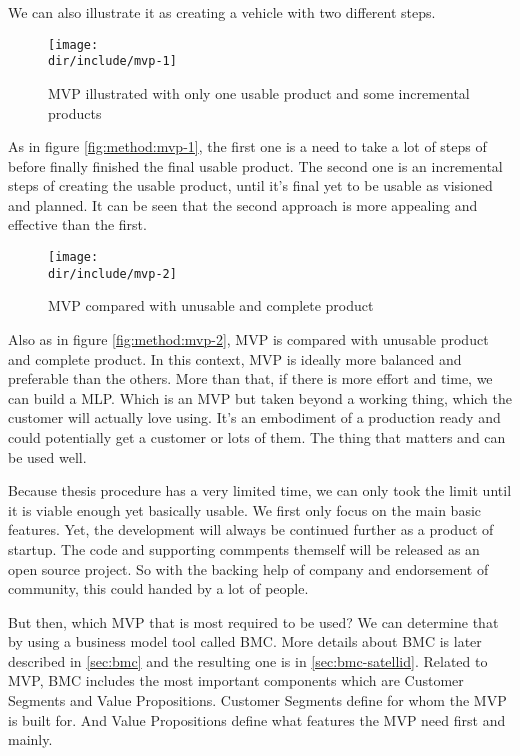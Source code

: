 We can also illustrate it as creating a vehicle with two different steps.

\begin{figure}[htb]
    \centering
    \texttt{[image: \\dir/include/mvp-1]}
    \caption[MVP illustrated]{MVP illustrated with only one usable product and some incremental products~\autocite{Mercury2014MVP}}
    \label{fig:method:mvp-1}
\end{figure}

As in figure \autoref{fig:method:mvp-1}, the first one is a need to take a lot of steps of before finally finished the final usable product.
The second one is an incremental steps of creating the usable product, until it's final yet to be usable as visioned and planned.
It can be seen that the second approach is more appealing and effective than the first.

\begin{figure}[htb]
    \centering
    \texttt{[image: \\dir/include/mvp-2]}
    \caption[MVP compared]{MVP compared with unusable and complete product~\autocite{Mercury2014MVP}}
    \label{fig:method:mvp-2}
\end{figure}

Also as in figure \autoref{fig:method:mvp-2}, \ac{MVP} is compared with unusable product and complete product.
In this context, \ac{MVP} is ideally more balanced and preferable than the others.
More than that, if there is more effort and time, we can build a \ac{MLP}.
Which is an \ac{MVP} but taken beyond a working thing, which the customer will actually love using.
It's an embodiment of a production ready and could potentially get a customer or lots of them.
The thing that matters and can be used well.

Because thesis procedure has a very limited time, we can only took the limit until it is viable enough yet basically usable.
We first only focus on the main basic features.
Yet, the development will always be continued further as a product of startup.
The code and supporting commpents themself will be released as an open source project.
So with the backing help of company and endorsement of community, this could handed by a lot of people.

But then, which \ac{MVP} that is most required to be used?
We can determine that by using a business model tool called \ac{BMC}.
More details about \ac{BMC} is later described in \autoref{sec:bmc} and the resulting one is in \autoref{sec:bmc-satellid}.
Related to \ac{MVP}, \ac{BMC} includes the most important components which are Customer Segments and Value Propositions.
Customer Segments define for whom the MVP is built for.
And Value Propositions define what features the MVP need first and mainly.

